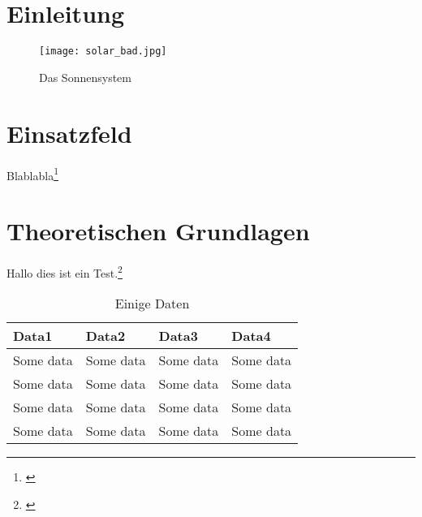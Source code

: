 
\setcounter{myPageRomanCounter}{\value{page}}

\section{Einleitung}
\label{sec:Einleitung}
\blindtext
\begin{figure}[h]
	\texttt{[image: solar\_bad.jpg]}
	\caption{Das Sonnensystem}
	\label{fig:das-sonnensystem}
\end{figure}
	
\section{Einsatzfeld}
\label{sec:Einsatzfeld}
\blindtext 
Blablabla\footnote{\cite[S.~20]{Reim.2015}}

\blindtext 

\section{Theoretischen Grundlagen}
\label{sec:Theorie}
\blindtext
Hallo dies ist ein Test.\footnote{\cite[S.~428]{Reim.2015}}

\begin{table}
	\begin{tabularx}{\textwidth}{X X X X}
		\toprule
		Data1 		& Data2 	& Data3		& Data4 \\
		\midrule
		Some data 	& Some data & Some data & Some data \\
		Some data 	& Some data & Some data & Some data \\
		Some data 	& Some data & Some data & Some data \\
		Some data 	& Some data & Some data & Some data \\
		\bottomrule
	\end{tabularx}
	\caption{Einige Daten}
	\label{tab:test-table}
\end{table}

